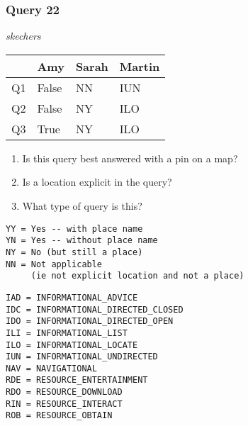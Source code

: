 \begin{frame}[fragile]
\frametitle{Query 22}
\vspace{1em}

\emph{skechers}

\vfill

\begin{table}
  \centering
  \begin{tabular}{ l l l l }
    & \textbf{Amy} & \textbf{Sarah} & \textbf{Martin}\\
    \toprule
    Q1 & False & NN & IUN\\
Q2 & False & NY & ILO\\
Q3 & True & NY & ILO\\
    \bottomrule
  \end{tabular}
\end{table}

\vfill

\tiny{

\begin{enumerate}
\item Is this query best answered with a pin on a map?
\item Is a location explicit in the query?
\item What type of query is this?
\end{enumerate}

\vfill

\begin{multicols}{2}
\begin{verbatim}
YY = Yes -- with place name
YN = Yes -- without place name
NY = No (but still a place)
NN = Not applicable 
     (ie not explicit location and not a place)
\end{verbatim}

\columnbreak
\begin{verbatim}
IAD = INFORMATIONAL_ADVICE
IDC = INFORMATIONAL_DIRECTED_CLOSED
IDO = INFORMATIONAL_DIRECTED_OPEN
ILI = INFORMATIONAL_LIST
ILO = INFORMATIONAL_LOCATE
IUN = INFORMATIONAL_UNDIRECTED
NAV = NAVIGATIONAL
RDE = RESOURCE_ENTERTAINMENT
RDO = RESOURCE_DOWNLOAD
RIN = RESOURCE_INTERACT
ROB = RESOURCE_OBTAIN
\end{verbatim}
\end{multicols}
}

\end{frame}


